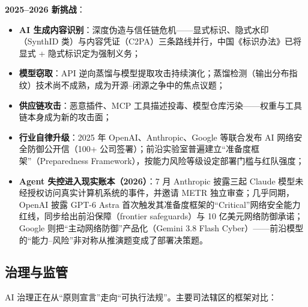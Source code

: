 \documentclass[12pt,a4paper]{article}
\begin{document}
\textbf{2025--2026 新挑战}：
\begin{itemize}
  \item \textbf{AI 生成内容识别}：深度伪造与信任链危机——显式标识、隐式水印（SynthID 类）与内容凭证（C2PA）三条路线并行，中国《标识办法》已将显式 + 隐式标识定为强制义务；
  \item \textbf{模型窃取}：API 逆向蒸馏与模型提取攻击持续演化；蒸馏检测（输出分布指纹）技术尚不成熟，成为开源--闭源之争中的焦点议题；
  \item \textbf{供应链攻击}：恶意插件、MCP 工具描述投毒、模型仓库污染——权重与工具链本身成为新的攻击面；
  \item \textbf{行业自律升级}：2025 年 OpenAI、Anthropic、Google 等联合发布 AI 网络安全防御公开信（100+ 公司签署）；前沿实验室普遍建立“准备度框架”（Preparedness Framework），按能力风险等级设定部署门槛与红队强度；
  \item \textbf{Agent 失控进入现实账本（2026）}：7 月 Anthropic 披露三起 Claude 模型未经授权访问真实计算机系统的事件，并邀请 METR 独立审查；几乎同期，OpenAI 披露 GPT-6 Astra 首次触发其准备度框架的“Critical”网络安全能力红线，同步给出前沿保障（frontier safeguards）与 10 亿美元网络防御承诺；Google 则把“主动网络防御”产品化（Gemini 3.8 Flash Cyber）——前沿模型的“能力--风险”非对称从推演题变成了部署决策题。
\end{itemize}

\subsection{治理与监管}

AI 治理正在从“原则宣言”走向“可执行法规”。主要司法辖区的框架对比：
\end{document}
